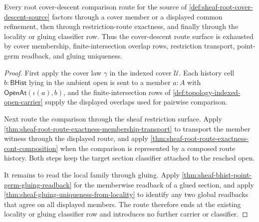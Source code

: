 \begin{theorem}
\label{thm:sheaf-root-cover-descent-gluing-exhaustion}
Every root cover-descent comparison route for the source of \autoref{def:sheaf-root-cover-descent-source} factors through a cover member or a displayed common refinement, then through restriction-route exactness, and finally through the locality or gluing classifier row. Thus the cover-descent route surface is exhausted by cover membership, finite-intersection overlap rows, restriction transport, point-germ readback, and gluing uniqueness.
\end{theorem}
\begin{proof}
First apply the cover law $\gamma$ in the indexed cover $\mathcal{U}$. Each history cell $b:\mathsf{BHist}$ lying in the ambient open is sent to a member $a:A$ with $\mathsf{OpenAt}(\iota(a),b)$, and the finite-intersection rows of \autoref{def:topology-indexed-open-carrier} supply the displayed overlaps used for pairwise comparison.

Next route the comparison through the sheaf restriction surface. Apply \autoref{thm:sheaf-root-route-exactness-membership-transport} to transport the member witness through the displayed route, and apply \autoref{thm:sheaf-root-route-exactness-cont-composition} when the comparison is represented by a composed route history. Both steps keep the target section classifier attached to the reached open.

It remains to read the local family through gluing. Apply \autoref{thm:sheaf-bhist-point-germ-gluing-readback} for the memberwise readback of a glued section, and apply \autoref{thm:sheaf-gluing-uniqueness-from-locality} to identify any two global readbacks that agree on all displayed members. The route therefore ends at the existing locality or gluing classifier row and introduces no further carrier or classifier.
\end{proof}

